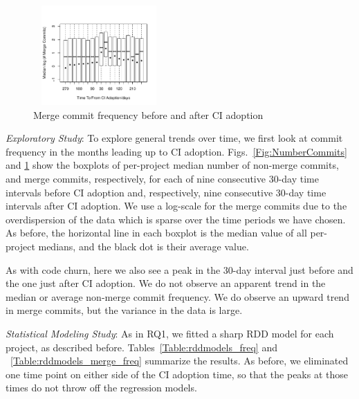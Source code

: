 \begin{figure}[!t]
\centering
\includegraphics[width=0.45\textwidth, height=1.5in, clip=true, trim=0 15 15 50]{merges.pdf}
\caption{Merge commit frequency before and after CI adoption}
\label{Fig:MergeCommits}
\end{figure}

\smallskip\noindent \emph{Exploratory Study}: 
To explore general trends over time, we first look at commit frequency in 
the months leading up to CI adoption.
Figs.~\ref{Fig:NumberCommits} and \ref{Fig:MergeCommits} show the boxplots of per-project median 
number of non-merge commits, and merge commits, respectively, for each of nine consecutive 30-day time intervals 
before CI adoption and, respectively, nine consecutive 30-day time intervals 
after CI adoption.
We use a log-scale for the merge commits due to the overdispersion of the data which is sparse over the time periods we have chosen.
As before, the horizontal line in each boxplot is the median value of all 
per-project medians, and the black dot is their average value.

As with code churn, here we also see a peak in the 30-day 
interval just before and the one just after CI adoption.
We do not observe an apparent trend in the 
median or average non-merge commit frequency.
We do observe an upward trend in merge commits, but the variance in the data is large.

\smallskip\noindent \emph{Statistical Modeling Study}: 
As in RQ1, we fitted a sharp RDD model for each project, as described before.
Tables~\ref{Table:rddmodels_freq} and ~\ref{Table:rddmodels_merge_freq} summarize the results.
As before, we eliminated one time point on either side of the CI adoption 
time, so that the peaks at those times  do not throw off the regression models.


